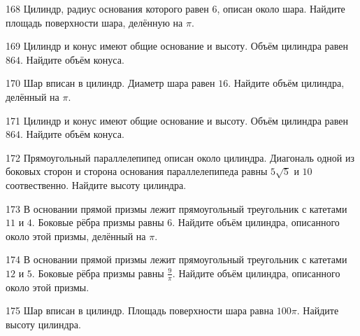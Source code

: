 \documentclass[4apaper]{article}
\begin{document}
\begin{taskBN}{168}
 Цилиндр, радиус основания которого равен $6$, описан около шара. Найдите площадь поверхности шара, делённую на $\pi$.
\end{taskBN}

\begin{taskBN}{169}
Цилиндр и конус имеют общие основание и высоту. Объём цилиндра равен $864$. Найдите объём конуса.
\end{taskBN}

\begin{taskBN}{170}
Шар вписан в цилиндр. Диаметр шара равен $16$. Найдите объём цилиндра, делённый на $\pi$.
\end{taskBN}

\begin{taskBN}{171}
Цилиндр и конус имеют общие основание и высоту. Объём цилиндра равен $864$. Найдите объём конуса.
\end{taskBN}

\begin{taskBN}{172}
Прямоугольный параллелепипед описан около цилиндра. Диагональ одной из боковых сторон и сторона основания параллелепипеда равны $5\sqrt{5}$ и $10$ соотвественно. Найдите высоту цилиндра.
\end{taskBN}

\begin{taskBN}{173}
В основании прямой призмы лежит прямоугольный треугольник с катетами $11$ и $4$. Боковые рёбра призмы равны $6$. Найдите объём цилиндра, описанного около этой призмы, делённый на $\pi$.
\end{taskBN}

\begin{taskBN}{174}
В основании прямой призмы лежит прямоугольный треугольник с катетами $12$ и $5$. Боковые рёбра призмы равны $\frac{9}{\pi}$. Найдите объём цилиндра, описанного около этой призмы.
\end{taskBN}

\begin{taskBN}{175}
Шар вписан в цилиндр. Площадь поверхности шара равна $100\pi$. Найдите высоту цилиндра.
\end{taskBN}
\end{document}
